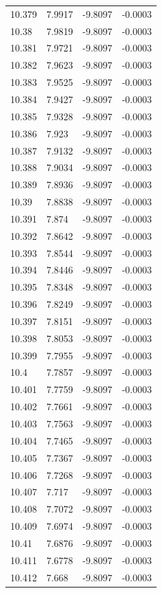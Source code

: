 \begin{tabular}{llll}
10.379 & 7.9917 & -9.8097 & -0.0003 \\
10.38 & 7.9819 & -9.8097 & -0.0003 \\
10.381 & 7.9721 & -9.8097 & -0.0003 \\
10.382 & 7.9623 & -9.8097 & -0.0003 \\
10.383 & 7.9525 & -9.8097 & -0.0003 \\
10.384 & 7.9427 & -9.8097 & -0.0003 \\
10.385 & 7.9328 & -9.8097 & -0.0003 \\
10.386 & 7.923 & -9.8097 & -0.0003 \\
10.387 & 7.9132 & -9.8097 & -0.0003 \\
10.388 & 7.9034 & -9.8097 & -0.0003 \\
10.389 & 7.8936 & -9.8097 & -0.0003 \\
10.39 & 7.8838 & -9.8097 & -0.0003 \\
10.391 & 7.874 & -9.8097 & -0.0003 \\
10.392 & 7.8642 & -9.8097 & -0.0003 \\
10.393 & 7.8544 & -9.8097 & -0.0003 \\
10.394 & 7.8446 & -9.8097 & -0.0003 \\
10.395 & 7.8348 & -9.8097 & -0.0003 \\
10.396 & 7.8249 & -9.8097 & -0.0003 \\
10.397 & 7.8151 & -9.8097 & -0.0003 \\
10.398 & 7.8053 & -9.8097 & -0.0003 \\
10.399 & 7.7955 & -9.8097 & -0.0003 \\
10.4 & 7.7857 & -9.8097 & -0.0003 \\
10.401 & 7.7759 & -9.8097 & -0.0003 \\
10.402 & 7.7661 & -9.8097 & -0.0003 \\
10.403 & 7.7563 & -9.8097 & -0.0003 \\
10.404 & 7.7465 & -9.8097 & -0.0003 \\
10.405 & 7.7367 & -9.8097 & -0.0003 \\
10.406 & 7.7268 & -9.8097 & -0.0003 \\
10.407 & 7.717 & -9.8097 & -0.0003 \\
10.408 & 7.7072 & -9.8097 & -0.0003 \\
10.409 & 7.6974 & -9.8097 & -0.0003 \\
10.41 & 7.6876 & -9.8097 & -0.0003 \\
10.411 & 7.6778 & -9.8097 & -0.0003 \\
10.412 & 7.668 & -9.8097 & -0.0003 \\

\end{tabular}
